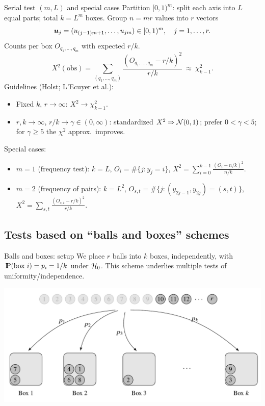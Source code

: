 \documentclass[aspectratio=169]{beamer}
\newcommand{\Prob}{{\rm I\hspace{-0.8mm}P}}
\begin{document}
\begin{frame}{Serial test \((m,L)\) and special cases}
Partition \([0,1)^m\): split each axis into \(L\) equal parts; total \(k=L^m\) boxes.
Group \(n=mr\) values into \(r\) vectors
\[
\mbox{\boldmath$u$}_j=(u_{(j-1)m+1},\ldots,u_{jm})\in[0,1)^m,\quad j=1,\ldots,r.
\]
Counts per box \(O_{q_1,\ldots,q_m}\) with expected \(r/k\).
\[
X^2(\text{obs})=\sum_{(q_1,\ldots,q_m)}\frac{(O_{q_1,\ldots,q_m}-r/k)^2}{r/k}\ \approx\ \chi^2_{k-1}.
\]
Guidelines (Holst; L’Ecuyer et al.):
\begin{itemize}
  \item Fixed \(k\), \(r\to\infty\): \(X^2\to\chi^2_{k-1}\).
  \item \(r,k\to\infty\), \(r/k\to\gamma\in(0,\infty)\): standardized \(X^2\Rightarrow{\cal N}(0,1)\);
        prefer \(0<\gamma<5\); for \(\gamma\ge5\) the \(\chi^2\) approx.\ improves.
\end{itemize}
Special cases:
\begin{itemize}
  \item \(m=1\) (frequency test): \(k=L\), \(O_i=\#\{j:y_j=i\}\), \(X^2=\sum_{i=0}^{k-1}\frac{(O_i-n/k)^2}{n/k}\).
  \item \(m=2\) (frequency of pairs): \(k=L^2\), \(O_{s,t}=\#\{j:(y_{2j-1},y_{2j})=(s,t)\}\),
        \(X^2=\sum_{s,t}\frac{(O_{s,t}-r/k)^2}{r/k}\).
\end{itemize}
\end{frame}


\subsection{Tests based on ``balls and boxes'' schemes}

\begin{frame}{Balls and boxes: setup}
We place \(r\) balls into \(k\) boxes, independently, with \(\Prob(\text{box }i)=p_i=1/k\) under \({\cal H}_0\).
This scheme underlies multiple tests of uniformity/independence.



\begin{center}
\includegraphics[width=0.8\linewidth]{pics/ball_into_boxes.png}
\end{center}
\end{frame}
\end{document}
